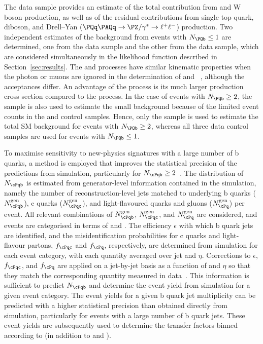 The \mj data sample provides an estimate of the total contribution
from \ttbar and W boson production, as well as of the residual
contributions from single top quark, diboson, and Drell--Yan
($\PQq\PAQq  \to \PZ/\gamma^* \to
\ell^+\ell^-$) production. Two independent estimates of the background
from \znunujets events with $\nb \leq 1$ are determined, one from the
\gj data sample and the other from the \mmj data sample, which are
considered simultaneously in the likelihood function described in
Section~\ref{sec:results}. The \gj and \zmumujets processes have
similar kinematic properties when the photon or muons are ignored in
the determination of \ETmiss and \HTmiss~\cite{Bern:2011pa}, although
the acceptances differ. An advantage of the \gj process is its much
larger production cross section compared to the \znunujets process. In
the case of events with $\nb \geq 2$, the \mj sample is also used to
estimate the small \znunujets background because of the limited event
counts in the \mmj and \gj control samples. Hence, only the \mj sample
is used to estimate the total SM background for events with $\nb \geq
2$, whereas all three data control samples are used for events with
$\nb \leq 1$.

To maximise sensitivity to new-physics signatures with a large number
of b quarks, a method is employed that improves the statistical
precision of the predictions from simulation, particularly for
$N_\cPqb \ge 2$~\cite{RA1Paper2012}. The distribution of $N_\cPqb$ is
estimated from generator-level information contained in the
simulation, namely the number of reconstruction-level jets matched to
underlying b quarks ($N_\cPqb^\text{gen}$), c quarks
($N_\cPqc^\text{gen}$), and light-flavoured quarks and gluons
($N_\cPq^\text{gen}$) per event. All relevant combinations of
$N_\cPqb^\text{gen}$, $N_\cPqc^\text{gen}$, and $N_{\cPq}^\text{gen}$
are considered, and events are categorised in terms of \njet and
\scalht.  The efficiency $\epsilon$ with which b quark jets are
identified, and the misidentification probabilities for c quarks and
light-flavour partons, $f_\cPqc$ and $f_\cPq$, respectively, are
determined from simulation for each event category, with each quantity
averaged over jet \pt and $\eta$. Corrections to $\epsilon$,
$f_\cPqc$, and $f_\cPq$ are applied on a jet-by-jet basis as a
function of \pt and $\eta$ so that they match the corresponding
quantity measured in data~\cite{Chatrchyan:2012jua}. This information
is sufficient to predict $N_\cPqb$ and determine the event yield from
simulation for a given event category. The event yields for a given b
quark jet multiplicity can be predicted with a higher statistical
precision than obtained directly from simulation, particularly for
events with a large number of b quark jets. These event yields are
subsequently used to determine the transfer factors binned according
to \nb (in addition to \njet and \scalht).

